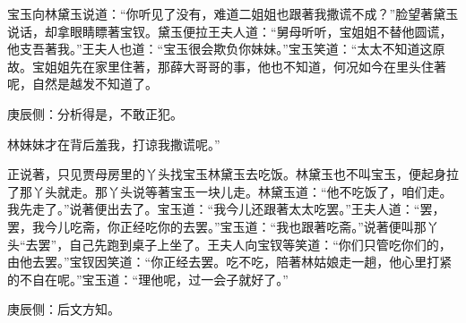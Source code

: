\begin{parag}
    宝玉向林黛玉说道：“你听见了没有，难道二姐姐也跟著我撒谎不成？”脸望著黛玉说话，却拿眼睛瞟著宝钗。黛玉便拉王夫人道：“舅母听听，宝姐姐不替他圆谎，他支吾著我。”王夫人也道：“宝玉很会欺负你妹妹。”宝玉笑道：“太太不知道这原故。宝姐姐先在家里住著，那薛大哥哥的事，他也不知道，何况如今在里头住著呢，自然是越发不知道了。\begin{note}庚辰侧：分析得是，不敢正犯。\end{note}林妹妹才在背后羞我，打谅我撒谎呢。”
\end{parag}


\begin{parag}
    正说著，只见贾母房里的丫头找宝玉林黛玉去吃饭。林黛玉也不叫宝玉，便起身拉了那丫头就走。那丫头说等著宝玉一块儿走。林黛玉道：“他不吃饭了，咱们走。我先走了。”说著便出去了。宝玉道：“我今儿还跟著太太吃罢。”王夫人道：“罢，罢，我今儿吃斋，你正经吃你的去罢。”宝玉道：“我也跟著吃斋。”说著便叫那丫头“去罢”，自己先跑到桌子上坐了。王夫人向宝钗等笑道：“你们只管吃你们的，由他去罢。”宝钗因笑道：“你正经去罢。吃不吃，陪著林姑娘走一趟，他心里打紧的不自在呢。”宝玉道：“理他呢，过一会子就好了。”\begin{note}庚辰侧：后文方知。\end{note}
\end{parag}



